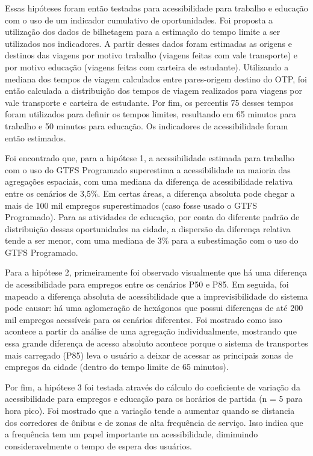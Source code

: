 \documentclass[        
    a4paper,          %
    12pt,             %
    chapter=TITLE,    %
    section=Title,    %
    subsection=Title, %
    oneside,          %
    english,          %
    spanish,          %
    brazil,           %
    fleqn             %
]{abntex2}
\begin{document}
  Essas hipóteses foram então testadas para acessibilidade para trabalho e educação com o uso de um indicador cumulativo de oportunidades. Foi proposta a utilização dos dados de bilhetagem para a estimação do tempo limite a ser utilizados nos indicadores. A partir desses dados foram estimadas as origens e destinos das viagens por motivo trabalho (viagens feitas com vale transporte) e por motivo educação (viagens feitas com carteira de estudante). Utilizando a mediana dos tempos de viagem calculados entre pares-origem destino do OTP, foi então calculada a distribuição dos tempos de viagem realizados para viagens por vale transporte e carteira de estudante. Por fim, os percentis 75 desses tempos foram utilizados para definir os tempos limites, resultando em 65 minutos para trabalho e 50 minutos para educação. Os indicadores de acessibilidade foram então estimados.
  
  Foi encontrado que, para a hipótese 1, a acessibilidade estimada para trabalho com o uso do GTFS Programado superestima a acessibilidade na maioria das agregações espaciais, com uma mediana da diferença de acessibilidade relativa entre os cenários de 3,5\%. Em certas áreas, a diferença absoluta pode chegar a mais de 100 mil empregos superestimados (caso fosse usado o GTFS Programado). Para as atividades de educação, por conta do diferente padrão de distribuição dessas oportunidades na cidade, a dispersão da diferença relativa tende a ser menor, com uma mediana de 3\% para a subestimação com o uso do GTFS Programado.
  
  Para a hipótese 2, primeiramente foi observado visualmente que há uma diferença de acessibilidade para empregos entre os cenários P50 e P85. Em seguida, foi mapeado a diferença absoluta de acessibilidade que a imprevisibilidade do sistema pode causar: há uma aglomeração de hexágonos que possui diferenças de até 200 mil empregos acessíveis para os cenários diferentes. Foi mostrado como isso acontece a partir da análise de uma agregação individualmente, mostrando que essa grande diferença de acesso absoluto acontece porque o sistema de transportes mais carregado (P85) leva o usuário a deixar de acessar as principais zonas de empregos da cidade (dentro do tempo limite de 65 minutos).
  
  Por fim, a hipótese 3 foi testada através do cálculo do coeficiente de variação da acessibilidade para empregos e educação para os horários de partida (n = 5 para hora pico). Foi mostrado que a variação tende a aumentar quando se distancia dos corredores de ônibus e de zonas de alta frequência de serviço. Isso indica que a frequência tem um papel importante na acessibilidade, diminuindo consideravelmente o tempo de espera dos usuários.
  
\end{document}
